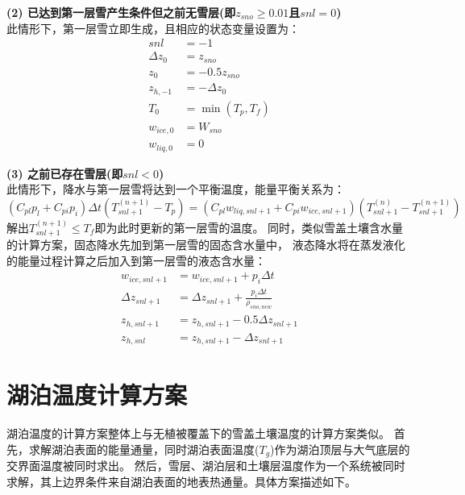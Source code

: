 \textbf {(2) 已达到第一层雪产生条件但之前无雪层(即$z_{sno}\geq0.01$且$snl=0$)}\\
此情形下，第一层雪立即生成，且相应的状态变量设置为：
\begin{equation}
\begin{aligned}
    snl &= -1 \\
    \Delta z_{0} &= z_{sno} \\
    z_{0} &= -0.5 z_{sno} \\
    z_{h,-1} &= -\Delta z_{0} \\
    T_{0} &= \min \left(T_{p}, T_{f}\right) \\
    w_{ice, 0} &= W_{sno} \\
    w_{liq, 0} &= 0
\end{aligned}
\end{equation}


\textbf {(3) 之前已存在雪层(即$snl<0$)}\\
此情形下，降水与第一层雪将达到一个平衡温度，能量平衡关系为：
\begin{equation}
\left(C_{pl} p_{l}+C_{pi} p_{i}\right) \Delta t\left(T_{snl+1}^{(n+1)}-T_{p}\right)=
\left(C_{pl} w_{liq, snl+1}+C_{p i} w_{ice, snl+1}\right)\left(T_{snl+1}^{(n)}-T_{snl+1}^{(n+1)}\right)
\end{equation}
解出$T_{snl+1}^{\left(n+1\right)}\le T_f$即为此时更新的第一层雪的温度。
同时，类似雪盖土壤含水量的计算方案，固态降水先加到第一层雪的固态含水量中，
液态降水将在蒸发液化的能量过程计算之后加入到第一层雪的液态含水量：
\begin{equation}
\begin{aligned}
    w_{ice, snl+1} &=  w_{ice, snl+1}+p_{i} \Delta t \\
    \Delta z_{snl+1} &= \Delta z_{snl+1}+\frac{p_{i} \Delta t}{\rho_{sno,new}} \\
    z_{h, snl+1} &= z_ {h, snl+1}-0.5 \Delta z_{snl+1} \\ 
    z_{h, snl} &= z_{h, snl+1}-\Delta z_{snl+1}
\end{aligned}
\end{equation}

\section{湖泊温度计算方案}
湖泊温度的计算方案整体上与无植被覆盖下的雪盖土壤温度的计算方案类似。
首先，求解湖泊表面的能量通量，同时湖泊表面温度($T_g$)作为湖泊顶层与大气底层的交界面温度被同时求出。
然后，雪层、湖泊层和土壤层温度作为一个系统被同时求解，其上边界条件来自湖泊表面的地表热通量。具体方案描述如下。

